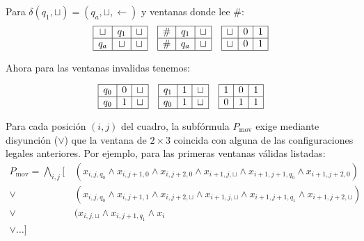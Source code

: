 Para $\delta(q_1, \sqcup) = (q_a, \sqcup, \leftarrow)$ y ventanas donde lee $\#$:$$\begin{array}{ccc} \begin{array}{|c|c|c|} \hline \sqcup & q_1 & \sqcup \\ \hline q_a & \sqcup & \sqcup \\ \hline \end{array} & \begin{array}{|c|c|c|} \hline \# & q_1 & \sqcup \\ \hline \# & q_a & \sqcup \\ \hline \end{array} & \begin{array}{|c|c|c|} \hline \sqcup & 0 & 1 \\ \hline \sqcup & 0 & 1 \\ \hline \end{array} \end{array}$$

Ahora para las ventanas invalidas tenemos:

$$\begin{array}{ccc} \begin{array}{|c|c|c|} \hline q_0 & 0 & \sqcup \\ \hline q_0 & 1 & \sqcup \\ \hline \end{array} & \begin{array}{|c|c|c|} \hline q_1 & 1 & \sqcup \\ \hline q_0 & 1 & \sqcup \\ \hline \end{array} & \begin{array}{|c|c|c|} \hline 1 & 0 & 1 \\ \hline 0 & 1 & 1 \\ \hline \end{array} \end{array}$$

Para cada posición $(i,j)$ del cuadro, la subfórmula $P_{\mathrm{mov}}$ exige mediante disyunción ($\vee$) que la ventana de $2 \times 3$ coincida con alguna de las configuraciones legales anteriores. Por ejemplo, para las primeras ventanas válidas listadas:
$$\begin{aligned}
P_{\mathrm{mov}} = \bigwedge_{i,j} \Big[ \,
& (x_{i,j,q_0} \wedge x_{i,j+1,0} \wedge x_{i,j+2,0} \wedge x_{i+1,j,\sqcup} \wedge x_{i+1,j+1,q_0} \wedge x_{i+1,j+2,0}) \\
\vee\; & (x_{i,j,q_0} \wedge x_{i,j+1,1} \wedge x_{i,j+2,\sqcup} \wedge x_{i+1,j,\sqcup} \wedge x_{i+1,j+1,q_1} \wedge x_{i+1,j+2,\sqcup}) \\
\vee\; & (x_{i,j,\sqcup} \wedge x_{i,j+1,q_1} \wedge x_{i}\\
\vee \dots \Big]
\end{aligned}$$

